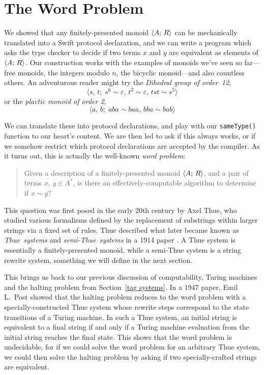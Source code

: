 \documentclass[../generics]{subfiles}
\begin{document}
\section{The Word Problem}\label{word problem}

We showed that any finitely-presented monoid $\langle A;\,R\rangle$ can be mechanically translated into a Swift protocol declaration, and we can write a program which asks the type checker to decide if two terms $x$ and $y$ are equivalent as elements of $\langle A;\,R\rangle$. Our construction works with the examples of monoids we've seen so far---free monoids, the integers modulo $n$, the bicyclic monoid---and also countless others. An adventurous reader might try the \emph{Dihedral group of order~12},
\[\langle s,\,t;\; s^6\sim\varepsilon,\, t^2\sim\varepsilon,\, tst\sim s^5\rangle\]
or the \emph{plactic monoid of order 2},
\[\langle a,\,b;\; aba\sim baa,\, bba\sim bab\rangle\]

We can translate these into protocol declarations, and play with our \texttt{sameType()} function to our heart's content. We are then led to ask if this always works, or if we somehow restrict which protocol declarations are accepted by the compiler. As it turns out, this is actually the well-known \emph{word problem}:
\begin{quote}
Given a description of a finitely-presented monoid $\langle A;\,R\rangle$, and a pair of terms $x$, $y\in A^*$, is there an effectively-computable algorithm to determine if $x\sim y$?
\end{quote}

This question was first posed in the early 20th century by Axel Thue, who studied various formalisms defined by the replacement of substrings within larger strings via a fixed set of rules. Thue described what later became known as \emph{Thue~systems} and \emph{semi-Thue~systems} in a 1914 paper \cite{thue_translation}. A Thue system is essentially a finitely-presented monoid, while a semi-Thue system is a string rewrite system, something we will define in the next section.

This brings us back to our previous discussion of computability, Turing machines and the halting problem from Section~\ref{tag systems}. In a 1947 paper, Emil L.~Post showed that the halting problem reduces to the word problem with a specially-constructed Thue system whose rewrite steps correspond to the state transitions of a Turing machine. In such a Thue system, an initial string is equivalent to a final string if and only if a Turing machine evaluation from the initial string reaches the final state. This shows that the word problem is undecidable, for if we could solve the word problem for an arbitrary Thue system, we could then solve the halting problem by asking if two specially-crafted strings are equivalent.
\end{document}
